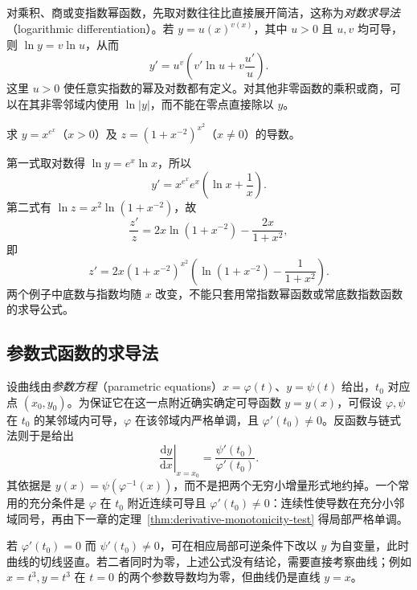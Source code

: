 \documentclass[UTF8,12pt,a4paper,fontset=fandol]{ctexbook}
\begin{document}
对乘积、商或变指数幂函数，先取对数往往比直接展开简洁，这称为\emph{对数求导法}（logarithmic differentiation）。若 $y=u(x)^{v(x)}$，其中 $u>0$ 且 $u,v$ 均可导，则 $\ln y=v\ln u$，从而
\begin{equation}
\label{eq:logarithmic-differentiation-variable-power}
    y'=u^v\left(v'\ln u+v\frac{u'}u\right).
\end{equation}
这里 $u>0$ 使任意实指数的幂及对数都有定义。对其他非零函数的乘积或商，可以在其非零邻域内使用 $\ln|y|$，而不能在零点直接除以 $y$。

\begin{example}
\label{ex:logarithmic-differentiation-examples}
求 $y=x^{e^x}$（$x>0$）及 $z=(1+x^{-2})^{x^2}$（$x\ne0$）的导数。
\end{example}
\begin{solve}
第一式取对数得 $\ln y=e^x\ln x$，所以
\[
    y'=x^{e^x}e^x\left(\ln x+\frac1x\right).
\]
第二式有 $\ln z=x^2\ln(1+x^{-2})$，故
\[
    \frac{z'}z
    =2x\ln(1+x^{-2})-\frac{2x}{1+x^2},
\]
即
\[
    z'=2x(1+x^{-2})^{x^2}
    \left(\ln(1+x^{-2})-\frac1{1+x^2}\right).
\]
两个例子中底数与指数均随 $x$ 改变，不能只套用常指数幂函数或常底数指数函数的求导公式。
\end{solve}

\subsection{参数式函数的求导法}
\label{subsec:parametric-differentiation}

设曲线由\emph{参数方程}（parametric equations）$x=\varphi(t)$、$y=\psi(t)$ 给出，$t_0$ 对应点 $(x_0,y_0)$。为保证它在这一点附近确实确定可导函数 $y=y(x)$，可假设 $\varphi,\psi$ 在 $t_0$ 的某邻域内可导，$\varphi$ 在该邻域内严格单调，且 $\varphi'(t_0)\ne0$。反函数与链式法则于是给出
\begin{equation}
\label{eq:parametric-first-derivative}
    \left.\frac{\mathrm dy}{\mathrm dx}\right|_{x=x_0}
    =\frac{\psi'(t_0)}{\varphi'(t_0)}.
\end{equation}
其依据是 $y(x)=\psi(\varphi^{-1}(x))$，而不是把两个无穷小增量形式地约掉。一个常用的充分条件是 $\varphi$ 在 $t_0$ 附近连续可导且 $\varphi'(t_0)\ne0$：连续性使导数在充分小邻域同号，再由下一章的定理~\ref{thm:derivative-monotonicity-test} 得局部严格单调。

若 $\varphi'(t_0)=0$ 而 $\psi'(t_0)\ne0$，可在相应局部可逆条件下改以 $y$ 为自变量，此时曲线的切线竖直。若二者同时为零，上述公式没有结论，需要直接考察曲线；例如 $x=t^3,y=t^3$ 在 $t=0$ 的两个参数导数均为零，但曲线仍是直线 $y=x$。
\end{document}
